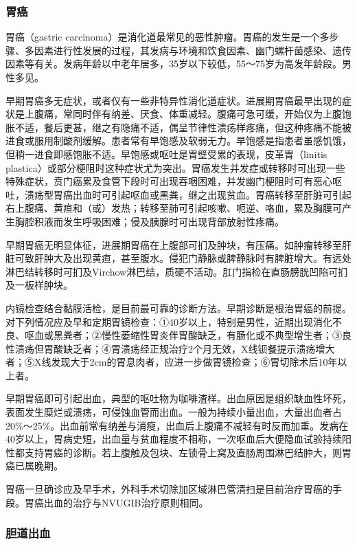 \subsubsection{胃癌}

胃癌（gastric
carcinoma）是消化道最常见的恶性肿瘤。胃癌的发生是一个多步骤、多因素进行性发展的过程，其发病与环境和饮食因素、幽门螺杆菌感染、遗传因素等有关。发病年龄以中老年居多，35岁以下较低，55～75岁为高发年龄段。男性多见。

早期胃癌多无症状，或者仅有一些非特异性消化道症状。进展期胃癌最早出现的症状是上腹痛，常同时伴有纳差、厌食、体重减轻。腹痛可急可缓，开始仅为上腹饱胀不适，餐后更甚，继之有隐痛不适，偶呈节律性溃疡样疼痛，但这种疼痛不能被进食或服用制酸剂缓解。患者常有早饱感及软弱无力。早饱感是指患者虽感饥饿，但稍一进食即感饱胀不适。早饱感或呕吐是胃壁受累的表现，皮革胃（linitis
plastica）或部分梗阻时这种症状尤为突出。胃癌发生并发症或转移时可出现一些特殊症状，贲门癌累及食管下段时可出现吞咽困难，并发幽门梗阻时可有恶心呕吐，溃疡型胃癌出血时可引起呕血或黑粪，继之出现贫血。胃癌转移至肝脏可引起右上腹痛、黄疸和（或）发热；转移至肺可引起咳嗽、呃逆、咯血，累及胸膜可产生胸腔积液而发生呼吸困难；侵及胰腺时可出现背部放射性疼痛。

早期胃癌无明显体征，进展期胃癌在上腹部可扪及肿块，有压痛。如肿瘤转移至肝脏可致肝肿大及出现黄疸，甚至腹水。侵犯门静脉或脾静脉时有脾脏增大。有远处淋巴结转移时可扪及Virchow淋巴结，质硬不活动。肛门指检在直肠膀胱凹陷可扪及一板样肿块。

内镜检查结合黏膜活检，是目前最可靠的诊断方法。早期诊断是根治胃癌的前提。对下列情况应及早和定期胃镜检查：①40岁以上，特别是男性，近期出现消化不良、呕血或黑粪者；②慢性萎缩性胃炎伴胃酸缺乏，有肠化或不典型增生者；③良性溃疡但胃酸缺乏者；④胃溃疡经正规治疗2个月无效，X线钡餐提示溃疡增大者；⑤X线发现大于2cm的胃息肉者，应进一步做胃镜检查；⑥胃切除术后10年以上者。

早期胃癌即可引起出血，典型的呕吐物为咖啡渣样。出血原因是组织缺血性坏死，表面发生糜烂或溃疡，可侵蚀血管而出血。一般为持续小量出血，大量出血者占20\%～25\%。出血前常有纳差与消瘦，出血后上腹痛不减轻有时反而加重。发病在40岁以上，胃病史短，出血量与贫血程度不相称，一次呕血后大便隐血试验持续阳性都支持胃癌的诊断。若上腹触及包块、左锁骨上窝及直肠周围淋巴结肿大，则胃癌已属晚期。

胃癌一旦确诊应及早手术，外科手术切除加区域淋巴管清扫是目前治疗胃癌的手段。胃癌出血的治疗与NVUGIB治疗原则相同。

\subsubsection{胆道出血}

